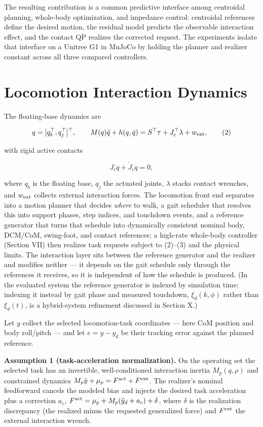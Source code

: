 \documentclass[journal]{IEEEtran}
\theoremstyle{plain}
\theoremstyle{definition}
\begin{document}
The resulting contribution is a common predictive interface among centroidal planning, whole-body optimization, and impedance control: centroidal references define the desired motion, the residual model predicts the observable interaction effect, and the contact QP realizes the corrected request. The experiments isolate that interface on a Unitree G1 in MuJoCo \cite{ref15} by holding the planner and realizer constant across all three compared controllers.

\section{Locomotion Interaction Dynamics}\label{sec:dynamics}

The floating-base dynamics are

\[
q=[q_b^\top,q_j^\top]^\top,\qquad
M(q)\ddot q+h(q,\dot q)=S^\top\tau+J_c^\top\lambda+w_{\rm ext},
\tag{2}
\]

with rigid active contacts

\[
J_c\ddot q+\dot J_c\dot q=0,
\tag{3}
\]

where \(q_b\) is the floating base, \(q_j\) the actuated joints, \(\lambda\) stacks contact wrenches, and \(w_{\rm ext}\) collects external interaction forces. The locomotion front end separates into a motion planner that decides \emph{where} to walk, a gait scheduler that resolves this into support phases, step indices, and touchdown events, and a reference generator that turns that schedule into dynamically consistent nominal body, DCM/CoM, swing-foot, and contact references; a high-rate whole-body controller (Section VII) then realizes task requests subject to (2)--(3) and the physical limits. The interaction layer sits between the reference generator and the realizer and modifies neither --- it depends on the gait schedule only through the references it receives, so it is independent of how the schedule is produced. (In the evaluated system the reference generator is indexed by simulation time; indexing it instead by gait phase and measured touchdown, \(\xi_d(k,\phi)\) rather than \(\xi_d(t)\), is a hybrid-system refinement discussed in Section X.)

Let \(y\) collect the selected locomotion-task coordinates --- here CoM position and body roll/pitch --- and let \(e=y-y_d\) be their tracking error against the planned reference.

\textbf{Assumption 1 (task-acceleration normalization).} On the operating set the selected task has an invertible, well-conditioned interaction inertia \(M_p(q,\rho)\) and constrained dynamics \(M_p\ddot y+\mu_p=F^{\rm act}+F^{\rm ext}\). The realizer's nominal feedforward cancels the modeled bias and injects the desired task acceleration plus a correction \(a_e\), \(F^{\rm act}=\mu_p+M_p(\ddot y_d+a_e)+\delta\), where \(\delta\) is the realization discrepancy (the realized minus the requested generalized force) and \(F^{\rm ext}\) the external interaction wrench.
\end{document}
